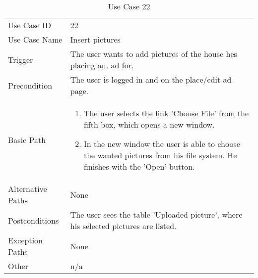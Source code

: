\begin{table}[H]
\centering
\label{table-use-case-22}
\begin{tabular}{|p{3cm}|p{10cm}}
Use Case ID       & 22                                                      \\
Use Case Name     & Insert pictures                            \\
Trigger           & The user wants to add pictures of the house hes placing an.
ad for. \\ 
Precondition      & The user is logged in and on the place/edit ad page.            
\\
Basic Path        & \begin{enumerate}
\item		The user selects the link 'Choose File' from the fifth box, which opens a
new window.
\item       In the new window the user is able to choose the wanted pictures
			from his file system. He finishes with the 'Open' button.
\end{enumerate} 
     \\
Alternative Paths & None                          \\
Postconditions    & The user sees the table 'Uploaded picture', where his
selected pictures are listed.
\\
Exception Paths   & None			\\
Other             & n/a                                                                                                                                                                                                        
\end{tabular}
\caption{Use Case 22}
\end{table}


